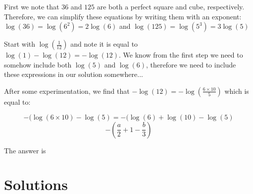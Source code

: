 \begin{solution}

First we note that $36$ and $125$ are both a perfect square and cube, respectively. Therefore, we can simplify these equations by writing them with an exponent: 
$\log(36) = \log(6^2) = 2\log(6)$ and $\log(125) = \log(5^3) = 3\log(5)$

Start with $\log(\frac{1}{12})$ and note it is equal to $\log(1)-\log(12) = -\log(12)$. We know from the first step we need to somehow include both $\log(5)$ and $\log(6)$, therefore we need to include these expressions in our solution somewhere...

After some experimentation, we find that $-\log(12) = -\log(\frac{6 \times 10}{5})$ which is equal to:

$$-(\log(6 \times 10) - \log(5) = -(\log(6)+\log(10)-\log(5)$$
$$-(\frac{a}{2}+1-\frac{b}{3})$$

The answer is 

\end{solution}



\newpage
\section{Solutions}


\printsolutions
